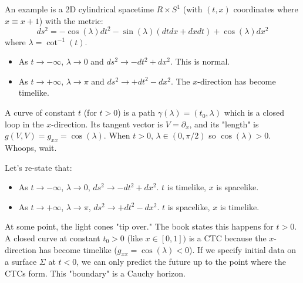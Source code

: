 \documentclass[11pt, a4paper]{report}
\begin{document}
An example is a 2D cylindrical spacetime $R \times S^1$ (with $(t,x)$ coordinates where $x \equiv x+1$) with the metric:
\begin{equation}
    ds^2 = -\cos(\lambda) dt^2 - \sin(\lambda) (dt dx + dx dt) + \cos(\lambda) dx^2
\end{equation}
where $\lambda = \cot^{-1}(t)$.
\begin{itemize}
    \item As $t \to -\infty$, $\lambda \to 0$ and $ds^2 \to -dt^2 + dx^2$. This is normal.
    \item As $t \to +\infty$, $\lambda \to \pi$ and $ds^2 \to +dt^2 - dx^2$. The $x$-direction has become timelike.
\end{itemize}
A curve of constant $t$ (for $t>0$) is a path $\gamma(\lambda) = (t_0, \lambda)$ which is a closed loop in the $x$-direction. Its tangent vector is $V = \partial_x$, and its "length" is $g(V,V) = g_{xx} = \cos(\lambda)$. When $t>0$, $\lambda \in (0, \pi/2)$ so $\cos(\lambda) > 0$. Whoops, wait.

Let's re-state that:
\begin{itemize}
    \item As $t \to -\infty$, $\lambda \to 0$, $ds^2 \to -dt^2 + dx^2$. $t$ is timelike, $x$ is spacelike.
    \item As $t \to +\infty$, $\lambda \to \pi$, $ds^2 \to +dt^2 - dx^2$. $t$ is spacelike, $x$ is timelike.
\end{itemize}
At some point, the light cones "tip over." The book states this happens for $t>0$.
A closed curve at constant $t_0 > 0$ (like $x \in [0, 1])$ is a CTC because the $x$-direction has become timelike ($g_{xx} = \cos(\lambda) < 0$).
If we specify initial data on a surface $\Sigma$ at $t<0$, we can only predict the future up to the point where the CTCs form. This "boundary" is a Cauchy horizon.
\end{document}
